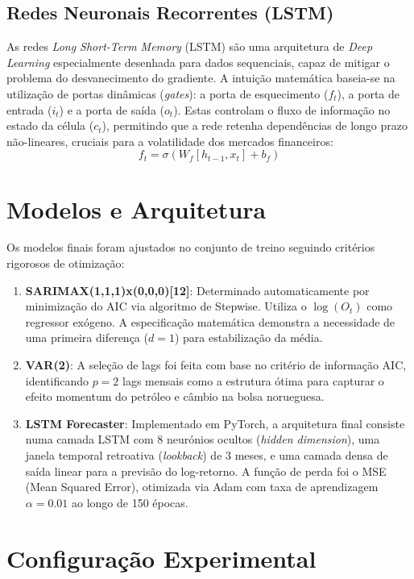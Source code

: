 \documentclass[11pt,a4paper]{article}
\begin{document}
\subsection{Redes Neuronais Recorrentes (LSTM)}
As redes \textit{Long Short-Term Memory} (LSTM) são uma arquitetura de \textit{Deep Learning} especialmente desenhada para dados sequenciais, capaz de mitigar o problema do desvanecimento do gradiente. A intuição matemática baseia-se na utilização de portas dinâmicas (\textit{gates}): a porta de esquecimento ($f_t$), a porta de entrada ($i_t$) e a porta de saída ($o_t$). Estas controlam o fluxo de informação no estado da célula ($c_t$), permitindo que a rede retenha dependências de longo prazo não-lineares, cruciais para a volatilidade dos mercados financeiros:
\begin{equation}
f_t = \sigma(W_f [h_{t-1}, x_t] + b_f)
\end{equation}

\section{Modelos e Arquitetura}
Os modelos finais foram ajustados no conjunto de treino seguindo critérios rigorosos de otimização:

\begin{enumerate}
    \item \textbf{SARIMAX(1,1,1)x(0,0,0)[12]}: Determinado automaticamente por minimização do AIC via algoritmo de Stepwise. Utiliza o $\log(O_t)$ como regressor exógeno. A especificação matemática demonstra a necessidade de uma primeira diferença ($d=1$) para estabilização da média.
    \item \textbf{VAR(2)}: A seleção de lags foi feita com base no critério de informação AIC, identificando $p=2$ lags mensais como a estrutura ótima para capturar o efeito momentum do petróleo e câmbio na bolsa norueguesa.
    \item \textbf{LSTM Forecaster}: Implementado em PyTorch, a arquitetura final consiste numa camada LSTM com $8$ neurónios ocultos (\textit{hidden dimension}), uma janela temporal retroativa (\textit{lookback}) de 3 meses, e uma camada densa de saída linear para a previsão do log-retorno. A função de perda foi o MSE (Mean Squared Error), otimizada via Adam com taxa de aprendizagem $\alpha = 0.01$ ao longo de 150 épocas.
\end{enumerate}

\section{Configuração Experimental}
\end{document}
